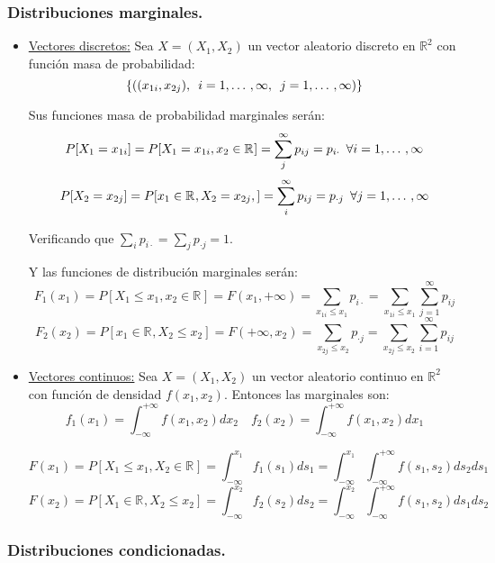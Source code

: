 \documentclass[a4paper, 11pt]{article}
\newcommand{\R}[1][]{\mathbb{R}^{#1}}
\begin{document}
\subsubsection*{Distribuciones marginales.}
\begin{itemize}
\item \underline{Vectores discretos:}  Sea $X=(X_1,X_2)$ un vector aleatorio discreto en $\R[2]$ con función masa de probabilidad:
\[
\{\left((x_{1i},x_{2j}), \enskip i=1,\dotso, \infty, \enskip j=1,\dotso, \infty\right)\}
\]

Sus funciones masa de probabilidad marginales serán:
\[
P[X_1=x_{1i}]=P[X_1=x_{1i},x_2\in\R]=\sum_{j}^\infty p_{ij}=p_{i\cdot} \enskip \forall i=1,\dotso, \infty
\]
\[
P[X_2=x_{2j}]=P[x_1\in\R, X_2=x_{2j},]=\sum_{i}^\infty p_{ij}=p_{\cdot j} \enskip \forall j=1,\dotso, \infty
\]

Verificando que $\sum_i p_{i\cdot}=\sum_j p_{\cdot j } = 1.$

Y las funciones de distribución marginales serán:
\[
F_1(x_1)=P[X_1\leq x_1, x_2\in\R]=F(x_1,+\infty)=\sum_{x_{1i}\leq x_1}p_{i\cdot}=\sum_{x_{1i}\leq x_1}\sum_{j=1}^\infty p_{ij}
\]
\[
F_2(x_2)=P[x_1\in\R, X_2\leq x_2]=F(+\infty,x_2)=\sum_{x_{2j}\leq x_2}p_{\cdot j}=\sum_{x_{2j}\leq x_2}\sum_{i=1}^\infty p_{ij}
\]

\item \underline{Vectores continuos:}  Sea $X=(X_1,X_2)$ un vector aleatorio continuo en $\R[2]$ con función de densidad $f(x_1,x_2)$. Entonces las marginales son:
\[
f_1(x_1)=\int_{-\infty}^{+\infty}f(x_1,x_2)dx_2 \quad f_2(x_2)=\int_{-\infty}^{+\infty}f(x_1,x_2)dx_1
\]

\[
F(x_1)=P[X_1\leq x_1, X_2\in\R]=\int_{-\infty}^{x_1}f_1(s_1)ds_1=\int_{-\infty}^{x_1}\int_{-\infty}^{+\infty}f(s_1, s_2)ds_2ds_1
\]
\[
F(x_2)=P[X_1\in\R, X_2\leq x_2]=\int_{-\infty}^{x_2}f_2(s_2)ds_2=\int_{-\infty}^{x_2}\int_{-\infty}^{+\infty}f(s_1, s_2)ds_1ds_2\]

\end{itemize}

\subsubsection*{Distribuciones condicionadas.}
\end{document}
